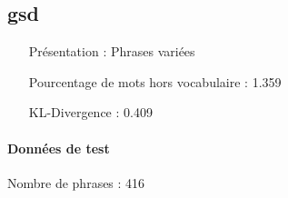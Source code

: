 \subsection{gsd } 
 \begin{itemize} 
 \item[Présentation :] Phrases variées

 \item[Pourcentage de mots hors vocabulaire : ]1.359
 \item[KL-Divergence :]0.409
 \end{itemize}  \paragraph{Données de test \\ }  
 Nombre de phrases : 416\\ 
